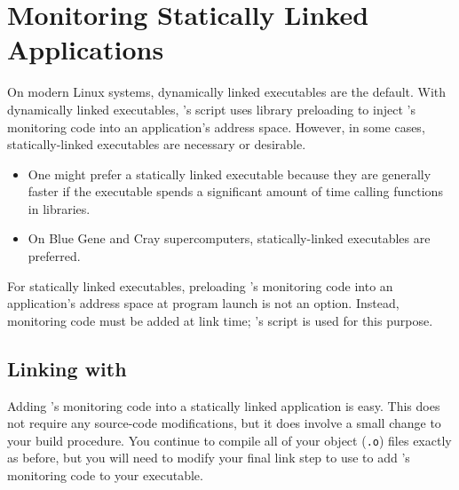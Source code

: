 \documentclass[11pt,letterpaper]{report}
\begin{document}

\chapter{Monitoring Statically Linked Applications}
\label{chpt:statically-linked-apps}



On modern Linux systems, dynamically linked executables are the default.
With dynamically linked executables, \HPCToolkit{}'s \hpcrun{} script uses library preloading to inject \HPCToolkit's monitoring code into an application's address space.
However, in some cases, statically-linked executables are necessary or desirable.
\begin{itemize}
\item One might prefer a statically linked executable because they are generally faster if the executable spends a significant amount of time calling functions in libraries.
\item On Blue Gene and Cray supercomputers, statically-linked executables are preferred.
\end{itemize}

For statically linked executables, preloading \HPCToolkit's monitoring code into an application's address space at program launch is not an option.
Instead, monitoring code must be added at link time; \HPCToolkit{}'s \hpclink{} script is used for this purpose.


\section{Linking with \hpclink{}}

Adding \HPCToolkit{}'s monitoring code into a statically linked application is easy.
This does not require any source-code modifications, but it does involve a small change to your build procedure.
You continue to compile all of your object (\texttt{.o}) files exactly as before, but you will need to modify your final link step to use \hpclink{} to add \HPCToolkit{}'s monitoring code to your executable.
\end{document}
